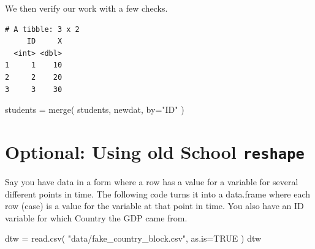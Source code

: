 \documentclass[
  letterpaper,
  DIV=11,
  numbers=noendperiod]{scrreprt}
\newenvironment{Shaded}{\begin{snugshade}}{\end{snugshade}}
\newcommand{\AttributeTok}[1]{\textcolor[rgb]{0.49,0.56,0.16}{#1}}
\newcommand{\ConstantTok}[1]{\textcolor[rgb]{0.53,0.00,0.00}{#1}}
\newcommand{\FunctionTok}[1]{\textcolor[rgb]{0.02,0.16,0.49}{#1}}
\newcommand{\NormalTok}[1]{\textcolor[rgb]{0.00,0.44,0.13}{#1}}
\newcommand{\OtherTok}[1]{\textcolor[rgb]{0.00,0.44,0.13}{#1}}
\newcommand{\SpecialCharTok}[1]{\textcolor[rgb]{0.25,0.44,0.63}{#1}}
\newcommand{\StringTok}[1]{\textcolor[rgb]{0.25,0.44,0.63}{#1}}
\begin{document}
We then verify our work with a few checks.

\begin{Shaded}
\end{Shaded}

\begin{verbatim}
# A tibble: 3 x 2
     ID     X
  <int> <dbl>
1     1    10
2     2    20
3     3    30
\end{verbatim}

\begin{Shaded}
\begin{Highlighting}[]
\NormalTok{students }\OtherTok{=} \FunctionTok{merge}\NormalTok{( students, newdat, }\AttributeTok{by=}\StringTok{"ID"}\NormalTok{ )}
\end{Highlighting}
\end{Shaded}

\hypertarget{optional-using-old-school-reshape}{%
\section{\texorpdfstring{Optional: Using old School
\texttt{reshape}}{Optional: Using old School reshape}}\label{optional-using-old-school-reshape}}

Say you have data in a form where a row has a value for a variable for
several different points in time. The following code turns it into a
data.frame where each row (case) is a value for the variable at that
point in time. You also have an ID variable for which Country the GDP
came from.

\begin{Shaded}
\begin{Highlighting}[]
\NormalTok{dtw }\OtherTok{=} \FunctionTok{read.csv}\NormalTok{( }\StringTok{"data/fake\_country\_block.csv"}\NormalTok{, }\AttributeTok{as.is=}\ConstantTok{TRUE}\NormalTok{ )}
\NormalTok{dtw}
\end{Highlighting}
\end{Shaded}
\end{document}
